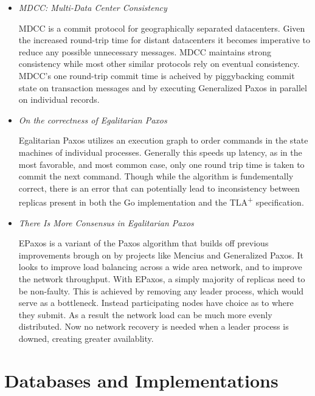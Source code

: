 \documentclass{article}
\begin{document}
\begin{itemize}
	\item
	\textit{MDCC: Multi-Data Center Consistency} \cite{MDCC}

	MDCC is a commit protocol for geographically separated datacenters.
	Given the increased round-trip time for distant datacenters it becomes imperative to reduce any possible unnecessary messages. MDCC maintains strong consistency while most other similar protocols rely on eventual consistency.
	MDCC's one round-trip commit time is acheived by piggybacking commit state on transaction messages
	and by executing Generalized Paxos in parallel on individual records.
	

	\item
	\textit{On the correctness of Egalitarian Paxos} \cite{SutraEPaxos}

	Egalitarian Paxos utilizes an execution graph to order commands in the state machines of individual processes.
	Generally this speeds up latency, as in the most favorable, and most common case, only one round trip time is taken to commit the next command.
	Though while the algorithm is fundementally correct, there is an error that can potentially lead to inconsistency between replicas present in both the Go implementation and the TLA\textsuperscript{+} specification. 

	\item
	\textit{There Is More Consensus in Egalitarian Paxos} \cite{EPaxos}

	EPaxos is a variant of the Paxos algorithm that builds off previous improvements brough on by projects like Mencius and Generalized Paxos.
	It looks to improve load balancing across a wide area network, and to improve the network throughput. With EPaxos, a simply majority of replicas need to be non-faulty.
	This is achieved by removing any leader process, which would serve as a bottleneck. Instead participating nodes have choice as to where they submit.
	As a result the network load can be much more evenly distributed. Now no network recovery is needed when a leader process is downed, creating greater availablity.


\end{itemize}

\section{Databases and Implementations}
\end{document}
